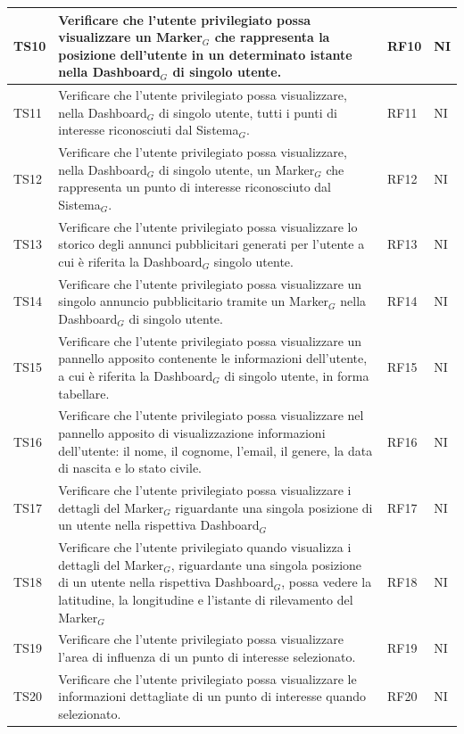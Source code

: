 \documentclass[10pt]{article}
\begin{document}
\begin{justify}
\begin{longtable}{|>{\centering\arraybackslash}m{2cm}|>{\centering\arraybackslash}m{7cm}|>{\centering\arraybackslash}m{2cm}|>{\centering\arraybackslash}m{2cm}|}
\hline
TS10 & Verificare che l'utente privilegiato possa visualizzare un Marker$_G$ che rappresenta la posizione dell'utente in un determinato istante nella Dashboard$_G$ di singolo utente. & RF10 & NI \\
\hline
TS11 & Verificare che l'utente privilegiato possa visualizzare, nella Dashboard$_G$ di singolo utente, tutti i punti di interesse riconosciuti dal Sistema$_G$. & RF11 & NI \\
\hline
TS12 & Verificare che l'utente privilegiato possa visualizzare, nella Dashboard$_G$ di singolo utente, un Marker$_G$ che rappresenta un punto di interesse riconosciuto dal Sistema$_G$. & RF12 & NI \\
\hline
TS13 & Verificare che l'utente privilegiato possa visualizzare lo storico degli annunci pubblicitari generati per l'utente a cui è riferita la Dashboard$_G$ singolo utente. & RF13 & NI \\
\hline
TS14 & Verificare che l'utente privilegiato possa visualizzare un singolo annuncio pubblicitario tramite un Marker$_G$ nella Dashboard$_G$ di singolo utente. & RF14 & NI \\
\hline
TS15 & Verificare che l'utente privilegiato possa visualizzare un pannello apposito contenente le informazioni dell'utente, a cui è riferita la Dashboard$_G$ di singolo utente, in forma tabellare. & RF15 & NI \\
\hline
TS16 & Verificare che l'utente privilegiato possa visualizzare nel pannello apposito di visualizzazione informazioni dell'utente: il nome, il cognome, l'email, il genere, la data di nascita e lo stato civile. & RF16 & NI \\
\hline
TS17 & Verificare che l'utente privilegiato possa visualizzare i dettagli del Marker$_G$ riguardante una singola posizione di un utente nella rispettiva Dashboard$_G$ & RF17 & NI \\
\hline
TS18 & Verificare che l'utente privilegiato quando visualizza i dettagli del Marker$_G$, riguardante una singola posizione di un utente nella rispettiva Dashboard$_G$, possa vedere la latitudine, la longitudine e l'istante di rilevamento del Marker$_G$ & RF18 & NI \\
\hline
TS19 & Verificare che l'utente privilegiato possa visualizzare l'area di influenza di un punto di interesse selezionato. & RF19 & NI \\
\hline
TS20 & Verificare che l'utente privilegiato possa visualizzare le informazioni dettagliate di un punto di interesse quando selezionato. & RF20 & NI \\

\end{longtable}
\end{justify}
\end{document}

